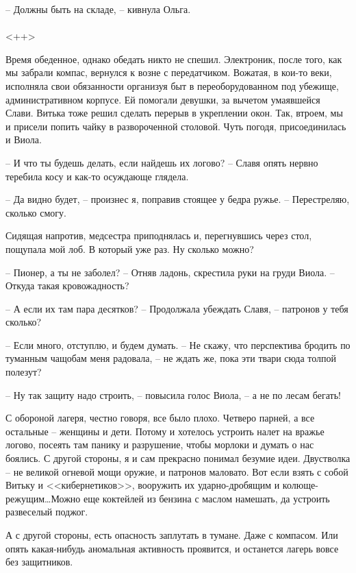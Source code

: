 \documentclass[a4paper]{book}
\begin{document}
-- Должны быть на складе, -- кивнула Ольга.

\paragraph{}<++>

Время обеденное, однако обедать никто не спешил. Электроник, после того, как мы забрали компас, вернулся к возне с передатчиком. Вожатая, в кои-то веки, исполняла свои обязанности организуя быт в переоборудованном под убежище, административном корпусе. Ей помогали девушки, за вычетом умаявшейся Слави. Витька тоже решил сделать перерыв в укреплении окон. Так, втроем, мы и присели попить чайку в развороченной столовой. Чуть погодя, присоединилась и Виола.

-- И что ты будешь делать, если найдешь их логово? -- Славя опять нервно теребила косу и как-то осуждающе глядела.

-- Да видно будет, -- произнес я, поправив стоящее у бедра ружье. --  Перестреляю, сколько смогу.

Сидящая напротив, медсестра приподнялась и, перегнувшись через стол, пощупала мой лоб. В который уже раз. Ну сколько можно?

-- Пионер, а ты не заболел? -- Отняв ладонь, скрестила руки на груди Виола. -- Откуда такая кровожадность?

-- А если их там пара десятков? -- Продолжала убеждать Славя, --  патронов у тебя сколько? 

-- Если много, отступлю, и будем думать. -- Не скажу, что перспектива бродить по туманным чащобам меня радовала, -- не ждать же, пока эти твари сюда толпой полезут?

-- Ну так защиту надо строить, -- повысила голос Виола, -- а не по лесам бегать! 

С обороной лагеря, честно говоря, все было плохо. Четверо парней, а все остальные -- женщины и дети. Потому и хотелось устроить налет на вражье логово, посеять там панику и разрушение, чтобы морлоки и думать о нас боялись. С другой стороны, я и сам прекрасно понимал безумие идеи. Двустволка -- не великой огневой мощи оружие, и патронов маловато. Вот если взять с собой Витьку и <<кибернетиков>>, вооружить их ударно-дробящим и колюще-режущим\ldots Можно еще коктейлей из бензина с маслом намешать, да устроить развеселый поджог. 

А с другой стороны, есть опасность заплутать в тумане. Даже с компасом. Или опять какая-нибудь аномальная активность проявится, и останется лагерь вовсе без защитников. 
\end{document}
